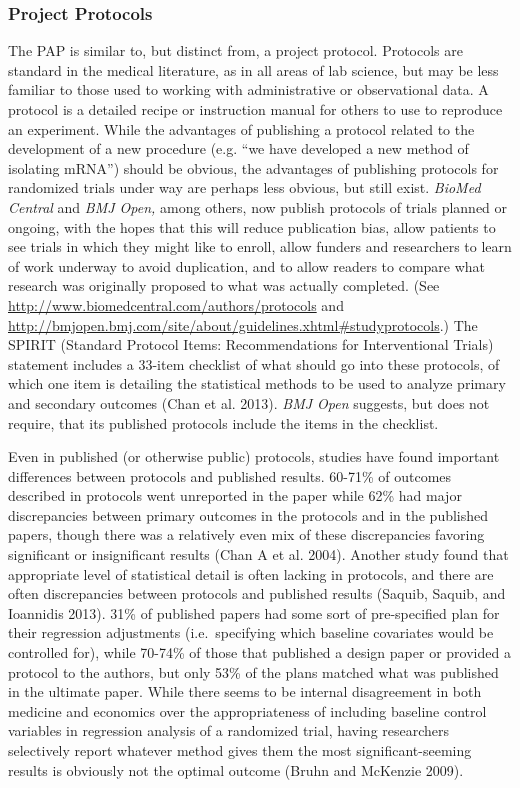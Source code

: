 \documentclass[12pt] {article}
\begin{document}
\subsubsection{Project Protocols}\label{project-protocols}

The PAP is similar to, but distinct from, a project protocol. Protocols
are standard in the medical literature, as in all areas of lab science,
but may be less familiar to those used to working with administrative or
observational data. A protocol is a detailed recipe or instruction
manual for others to use to reproduce an experiment. While the
advantages of publishing a protocol related to the development of a new
procedure (e.g. ``we have developed a new method of isolating mRNA'')
should be obvious, the advantages of publishing protocols for randomized
trials under way are perhaps less obvious, but still exist. \emph{BioMed
Central} and \emph{BMJ Open,} among others, now publish protocols of
trials planned or ongoing, with the hopes that this will reduce
publication bias, allow patients to see trials in which they might like
to enroll, allow funders and researchers to learn of work underway to
avoid duplication, and to allow readers to compare what research was
originally proposed to what was actually completed. (See
\url{http://www.biomedcentral.com/authors/protocols} and
\hyperref[studyprotocols]{http://bmjopen.bmj.com/site/about/guidelines.xhtml\#studyprotocols}.)
The SPIRIT (Standard Protocol Items: Recommendations for Interventional
Trials) statement includes a 33-item checklist of what should go into
these protocols, of which one item is detailing the statistical methods
to be used to analyze primary and secondary outcomes (Chan et al. 2013).
\emph{BMJ Open} suggests, but does not require, that its published
protocols include the items in the checklist.

Even in published (or otherwise public) protocols, studies have found
important differences between protocols and published results. 60-71\%
of outcomes described in protocols went unreported in the paper while
62\% had major discrepancies between primary outcomes in the protocols
and in the published papers, though there was a relatively even mix of
these discrepancies favoring significant or insignificant results (Chan
A et al. 2004). Another study found that appropriate level of
statistical detail is often lacking in protocols, and there are often
discrepancies between protocols and published results (Saquib, Saquib,
and Ioannidis 2013). 31\% of published papers had some sort of
pre-specified plan for their regression adjustments (i.e.~specifying
which baseline covariates would be controlled for), while 70-74\% of
those that published a design paper or provided a protocol to the
authors, but only 53\% of the plans matched what was published in the
ultimate paper. While there seems to be internal disagreement in both
medicine and economics over the appropriateness of including baseline
control variables in regression analysis of a randomized trial, having
researchers selectively report whatever method gives them the most
significant-seeming results is obviously not the optimal outcome (Bruhn
and McKenzie 2009).
\end{document}
